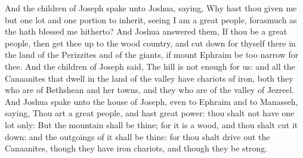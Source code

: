 \begin{biblechapter}
\verse And the children of Joseph spake unto Joshua, saying, Why hast thou given me but one lot and one portion to inherit, seeing I am a great people, forasmuch as the \LORD hath blessed me hitherto?
\verse And Joshua answered them, If thou be a great people, then get thee up to the wood country, and cut down for thyself there in the land of the Perizzites and of the giants, if mount Ephraim be too narrow for thee.
\verse And the children of Joseph said, The hill is not enough for us: and all the Canaanites that dwell in the land of the valley have chariots of iron, both they who are of Bethshean and her towns, and they who are of the valley of Jezreel.
\verse And Joshua spake unto the house of Joseph, even to Ephraim and to Manasseh, saying, Thou art a great people, and hast great power: thou shalt not have one lot only:
\verse But the mountain shall be thine; for it is a wood, and thou shalt cut it down: and the outgoings of it shall be thine: for thou shalt drive out the Canaanites, though they have iron chariots, and though they be strong.
\end{biblechapter}

